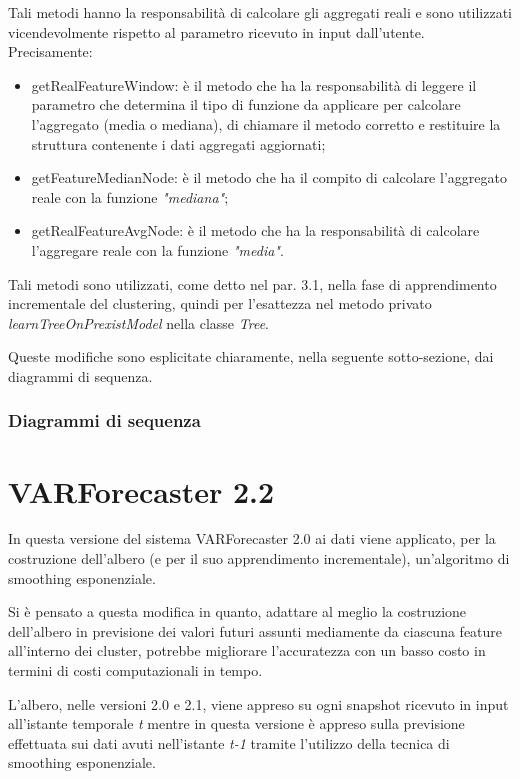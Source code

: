 \documentclass[12pt,a4paper,twoside,openright]{book}
\begin{document}
Tali metodi hanno la responsabilità di calcolare gli aggregati reali e sono utilizzati vicendevolmente rispetto al parametro ricevuto in input dall'utente. Precisamente:
\begin{itemize}
\item getRealFeatureWindow: è il metodo che ha la responsabilità di leggere il parametro che determina il tipo di funzione da applicare per calcolare l'aggregato (media o mediana), di chiamare il metodo corretto e restituire la struttura contenente i dati aggregati aggiornati;
\item getFeatureMedianNode: è il metodo che ha il compito di calcolare l'aggregato reale con la funzione \textit{"mediana"};
\item getRealFeatureAvgNode: è il metodo che ha la responsabilità di calcolare l'aggregare reale con la funzione \textit{"media"}.
\end{itemize}

Tali metodi sono utilizzati, come detto nel par. 3.1, nella fase di apprendimento incrementale del clustering, quindi per l'esattezza nel metodo privato \textit{learnTreeOnPrexistModel} nella classe \textit{Tree}.

Queste modifiche sono esplicitate chiaramente, nella seguente sotto-sezione, dai diagrammi di sequenza. 
\newpage
\subsubsection{Diagrammi di sequenza}

\newpage
\section{VARForecaster 2.2}
In questa versione del sistema VARForecaster 2.0 ai dati viene applicato, per la costruzione dell'albero (e per il suo apprendimento incrementale), un'algoritmo di smoothing esponenziale. 

Si è pensato a questa modifica in quanto, adattare al meglio la costruzione dell'albero in previsione dei valori futuri assunti mediamente da ciascuna feature all'interno dei cluster, potrebbe migliorare l'accuratezza con un basso costo in termini di costi computazionali in tempo.

L'albero, nelle versioni 2.0 e 2.1, viene appreso su ogni snapshot ricevuto in input all'istante temporale \textit{t} mentre in questa versione è appreso sulla previsione effettuata sui dati avuti nell'istante \textit{t-1} tramite l'utilizzo della tecnica di smoothing esponenziale. 
\end{document}
